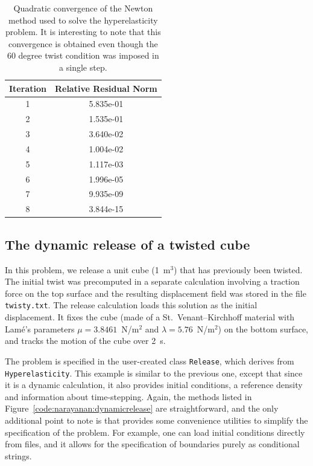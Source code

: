 \begin{table}
  \centering
  \begin{tabular}{|c|c|}
    \hline Iteration & Relative Residual Norm \\
    \hline
    1 & 5.835e-01\\
    2 & 1.535e-01\\
    3 & 3.640e-02\\
    4 & 1.004e-02\\
    5 & 1.117e-03\\
    6 & 1.996e-05\\
    7 & 9.935e-09\\
    8 & 3.844e-15\\
    \hline
  \end{tabular}
  \caption{Quadratic convergence of the Newton method used to solve
    the hyperelasticity problem. It is interesting to note that this
    convergence is obtained even though the 60 degree twist condition
    was imposed in a single step.}
  \label{tab:narayanan:residualnorms}
\end{table}

\subsection{The dynamic release of a twisted cube}

In this problem, we release a unit cube (1~m$^3$) that has previously
been twisted. The initial twist was precomputed in a separate
calculation involving a traction force on the top surface and the
resulting displacement field was stored in the file {\tt
twisty.txt}. The release calculation loads this solution as the
initial displacement. It fixes the cube (made of a
St.~Venant--Kirchhoff material with Lam\'e's parameters $\mu =
3.8461$~N/m$^2$ and $\lambda = 5.76$~N/m$^2$) on the bottom surface,
and tracks the motion of the cube over 2~s.

The problem is specified in the user-created class {\tt Release},
which derives from {\tt Hyperelasticity}. This example is similar to
the previous one, except that since it is a dynamic calculation, it also
provides initial conditions, a reference density and information about
time-stepping. Again, the methods listed in
Figure~\ref{code:narayanan:dynamicrelease} are straightforward, and
the only additional point to note is that \twist{} provides some
convenience utilities to simplify the specification of the
problem. For example, one can load initial conditions directly from
files, and it allows for the specification of boundaries purely as
conditional strings.

